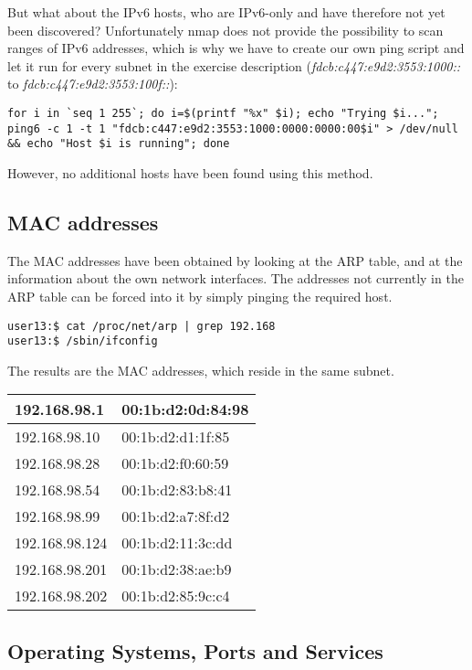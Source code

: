\documentclass[12pt,a4paper,titlepage,oneside]{scrartcl}
\begin{document}
But what about the IPv6 hosts, who are IPv6-only and have therefore not yet been discovered? Unfortunately nmap does not provide the possibility to scan ranges of IPv6 addresses, which is why we have to create our own ping script and let it run for every subnet in the exercise description (\emph{fdcb:c447:e9d2:3553:1000::} to \emph{fdcb:c447:e9d2:3553:100f::}):

\begin{lstlisting}[style=simple]
for i in `seq 1 255`; do i=$(printf "%x" $i); echo "Trying $i..."; ping6 -c 1 -t 1 "fdcb:c447:e9d2:3553:1000:0000:0000:00$i" > /dev/null && echo "Host $i is running"; done
\end{lstlisting}

However, no additional hosts have been found using this method.

\subsection{MAC addresses}

The MAC addresses have been obtained by looking at the ARP table, and at the information about the own network interfaces. The addresses not currently in the ARP table can be forced into it by simply pinging the required host.

\begin{lstlisting}[style=simple]
user13:$ cat /proc/net/arp | grep 192.168
user13:$ /sbin/ifconfig
\end{lstlisting}

The results are the MAC addresses, which reside in the same subnet.

\begin{tabular}{| l | l |}
\hline
192.168.98.1 & 00:1b:d2:0d:84:98 \\ \hline
192.168.98.10 & 00:1b:d2:d1:1f:85 \\ \hline
192.168.98.28 & 00:1b:d2:f0:60:59 \\ \hline
192.168.98.54 & 00:1b:d2:83:b8:41 \\ \hline
192.168.98.99 & 00:1b:d2:a7:8f:d2 \\ \hline
192.168.98.124 & 00:1b:d2:11:3c:dd \\ \hline
192.168.98.201 & 00:1b:d2:38:ae:b9 \\ \hline
192.168.98.202 & 00:1b:d2:85:9c:c4 \\ \hline
\end{tabular}

\subsection{Operating Systems, Ports and Services}
\end{document}
